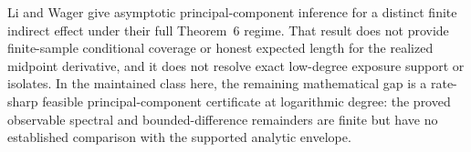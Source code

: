 Li and Wager give asymptotic principal-component inference for a distinct finite indirect effect under their full Theorem~6 regime.  That result does not provide finite-sample conditional coverage or honest expected length for the realized midpoint derivative, and it does not resolve exact low-degree exposure support or isolates.  In the maintained class here, the remaining mathematical gap is a rate-sharp feasible principal-component certificate at logarithmic degree: the proved observable spectral and bounded-difference remainders are finite but have no established comparison with the supported analytic envelope.